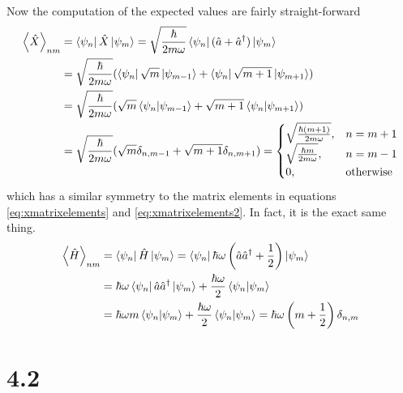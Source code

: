 \documentclass{article}
\begin{document}
Now the computation of the expected values are fairly straight-forward
\begin{align*}
\ev{\hat{X}}_{nm}&=\bra{\psi_n}\hat{X}\ket{\psi_m}=\sqrt{\frac{\hbar}{2m\omega}}\bra{\psi_n}(\hat{a}+\hat{a}^{\dagger})\ket{\psi_m} \\
&=\sqrt{\frac{\hbar}{2m\omega}}(\bra{\psi_n}\sqrt{m}\ket{\psi_{m-1}}+\bra{\psi_n}\sqrt{m+1}\ket{\psi_{m+1}}) \\
&= \sqrt{\frac{\hbar}{2m\omega}}(\sqrt{m}\bra{\psi_n}\ket{\psi_{m-1}}+\sqrt{m+1}\bra{\psi_n}\ket{\psi_{m+1}}) \\
&= \sqrt{\frac{\hbar}{2m\omega}}(\sqrt{m}\delta_{n,m-1}+\sqrt{m+1}\delta_{n,m+1}) 
= \begin{cases}
	\sqrt{\frac{\hbar (m+1)}{2m\omega}}, & n=m+1 \\
	\sqrt{\frac{\hbar m}{2m\omega}}, & n=m-1\\
	0, & \text{otherwise}
\end{cases}
\end{align*}
which has a similar symmetry to the matrix elements in equations \ref{eq:xmatrixelements} and \ref{eq:xmatrixelements2}. In fact, it is the exact same thing. 
\begin{align*}
\ev{\hat{H}}_{nm}&=\bra{\psi_n}\hat{H}\ket{\psi_m}=\bra{\psi_n}\hbar\omega\left(\hat{a}\hat{a}^{\dagger}+\frac{1}{2}\right)\ket{\psi_m} \\
&= \hbar\omega \bra{\psi_n}\hat{a}\hat{a}^{\dagger}\ket{\psi_m}+\frac{\hbar\omega}{2}\braket{\psi_n}{\psi_m}\\
&=\hbar\omega m\braket{\psi_n}{\psi_m}+\frac{\hbar\omega}{2}\braket{\psi_n}{\psi_m} = \hbar\omega\left(m+\frac{1}{2}\right) \delta_{n,m}
\end{align*}

\section*{4.2}
\end{document}
